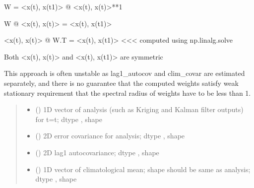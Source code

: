 \documentclass[letterpaper,10pt,english]{sphinxmanual}
\begin{document}
\begin{fulllineitems}
\begin{fulllineitems}
\sphinxAtStartPar
W = \textless{}x(t), x(t\sphinxhyphen{}1)\textgreater{} @ \textless{}x(t), x(t)\textgreater{}**\sphinxhyphen{}1

\sphinxAtStartPar
W @ \textless{}x(t), x(t)\textgreater{} = \textless{}x(t), x(t\sphinxhyphen{}1)\textgreater{}

\sphinxAtStartPar
\textless{}x(t), x(t)\textgreater{} @ W.T = \textless{}x(t), x(t\sphinxhyphen{}1)\textgreater{}  \textless{}\textless{}\textless{} computed using np.linalg.solve

\sphinxAtStartPar
Both \textless{}x(t), x(t)\textgreater{} and \textless{}x(t), x(t\sphinxhyphen{}1)\textgreater{} are symmetric

\sphinxAtStartPar
This approach is often unstable as lag1\_autocov and clim\_covar
are estimated separately, and there is no guarantee that the computed
weights satisfy weak stationary requirement that the spectral radius
of weights have to be less than 1.
\begin{quote}\begin{description}
\begin{itemize}
\item {}
\sphinxAtStartPar
{} () \textendash{} 1D vector of analysis (such as Kriging and
Kalman filter outputs) for t=t;
dtype , shape 

\item {}
\sphinxAtStartPar
{} () \textendash{} 2D error covariance for analysis;
dtype , shape 

\item {}
\sphinxAtStartPar
{} () \textendash{} 2D lag\sphinxhyphen{}1 autocovariance;
dtype , shape 

\item {}
\sphinxAtStartPar
{} () \textendash{} 1D vector of climatological mean;
shape should be same as analysis;
dtype , shape 


\end{itemize}
\end{description}
\end{quote}
\end{fulllineitems}
\end{fulllineitems}
\end{document}
